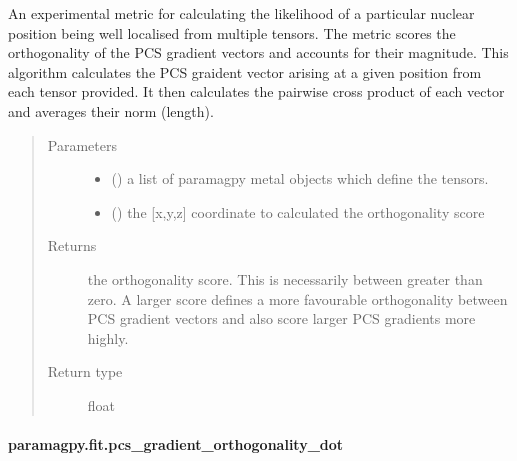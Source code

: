 \documentclass[a4paper,10pt,english,openany,oneside]{sphinxmanual}
\begin{document}
\begin{fulllineitems}
\label{\detokenize{reference/generated/paramagpy.fit.pcs_gradient_orthogonality_cross:paramagpy.fit.pcs_gradient_orthogonality_cross}}
An experimental metric for calculating the likelihood
of a particular nuclear position being well localised
from multiple tensors.
The metric scores the orthogonality of the PCS
gradient vectors and accounts for their magnitude.
This algorithm calculates the PCS graident
vector arising at a given position from each tensor
provided. It then calculates the pairwise cross product
of each vector and averages their norm (length).
\begin{quote}\begin{description}
\item[{Parameters}] \leavevmode\begin{itemize}
\item {} 
 () \textendash{} a list of paramagpy metal objects which define the
tensors.

\item {} 
 () \textendash{} the {[}x,y,z{]} coordinate to calculated the
orthogonality score

\end{itemize}

\item[{Returns}] \leavevmode
{} \textendash{} the orthogonality score. This is necessarily
between greater than zero. A larger
score defines a more favourable orthogonality
between PCS gradient vectors and also score larger
PCS gradients more highly.

\item[{Return type}] \leavevmode
float

\end{description}\end{quote}

\end{fulllineitems}



\paragraph{paramagpy.fit.pcs\_gradient\_orthogonality\_dot}
\label{\detokenize{reference/generated/paramagpy.fit.pcs_gradient_orthogonality_dot:paramagpy-fit-pcs-gradient-orthogonality-dot}}\label{\detokenize{reference/generated/paramagpy.fit.pcs_gradient_orthogonality_dot::doc}}
\end{document}
